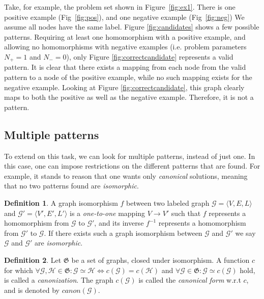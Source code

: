 \documentclass{article}
\theoremstyle{definition}
\newtheorem{definition}{Definition}[section]
\newcommand{\triple}[1]{\ensuremath{\langle #1 \rangle}}
\newcommand{\graph}[1]{\ensuremath{\mathcal{#1}}}
\newcommand{\graphset}[1]{\ensuremath{\mathfrak{#1}}}
\begin{document}
Take, for example, the problem set shown in Figure~\ref{fig:ex1}.
There is one positive example (Fig~\ref{fig:pos}), and one negative example (Fig~\ref{fig:neg})
We assume all nodes have the same label.
Figure \ref{fig:candidates} shows a few possible patterns.
Requiring at least one homomorphism with a positive example, and allowing no homomorphisms with negative examples (i.e. problem parameters $N_{+}=1$ and $N_{-}=0$), only Figure \ref{fig:correctcandidate} represents a valid pattern.
It is clear that there exists a mapping from each node from the valid pattern to a node of the positive example, while no such mapping exists for the negative example.
Looking at Figure \ref{fig:correctcandidate}, this graph clearly maps to both the positive as well as the negative example. Therefore, it is not a pattern.

\subsection{Multiple patterns}
To extend on this task, we can look for multiple patterns, instead of just one.
In this case, one can impose restrictions on the different patterns that are found.
For example, it stands to reason that one wants only \emph{canonical} solutions, meaning that no two patterns found are \emph{isomorphic}.

\begin{definition}
\label{def:isomorphism}
A graph isomorphism $f$ between two labeled graph $\graph{G} = \triple{V,E,L}$ and $\graph{G'} = \triple{V',E',L'}$ is a \emph{one-to-one} mapping $V \rightarrow V'$ 
such that $f$ represents a homomorphism from $\graph{G}$ to $\graph{G'}$,
and its inverse $f^{-1}$ represents a homomorphism from $\graph{G'}$ to $\graph{G}$.
If there exists such a graph isomorphism between $\graph{G}$ and $\graph{G'}$ we say $\graph{G}$ and $\graph{G'}$ are \emph{isomorphic}.
\end{definition}


\begin{definition}
\label{def:canonicalForm}
Let $\graphset{G}$ be a set of graphs, closed under isomorphism.
A function $c$ for which $\forall \graph{G,H} \in \graphset{G} : \graph{G} \simeq \graph{H} \iff c(\graph{G}) = c(\graph{H})$ and $\forall \graph{G} \in \graphset{G} : \graph{G} \simeq c(\graph{G})$ hold, is called a \emph{canonization}.
The graph $c(\graph{G})$ is called the \emph{canonical form} w.r.t $c$, and is denoted by $\mathit{canon}(\graph{G})$.
\end{definition}
\end{document}
